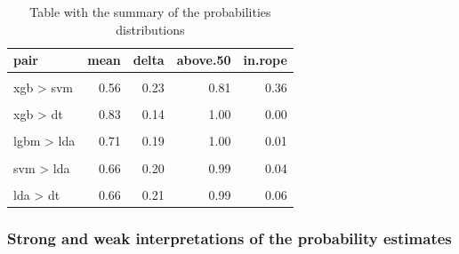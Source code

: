 \documentclass[twoside,11pt,preprint]{article}
\begin{document}
\begin{table}

\caption{\label{tab:xtaball2}\label{tab:main}Table with the summary of the probabilities distributions}
\centering
\begin{tabular}[t]{lrrrr}
\toprule
\textbf{pair} & \textbf{mean} & \textbf{delta} & \textbf{above.50} & \textbf{in.rope}\\
\midrule
\cellcolor{gray!6}{xgb > lgbm} & \cellcolor{gray!6}{0.51} & \cellcolor{gray!6}{0.23} & \cellcolor{gray!6}{0.56} & \cellcolor{gray!6}{0.51}\\
xgb > svm & 0.56 & 0.23 & 0.81 & 0.36\\
\cellcolor{gray!6}{xgb > lda} & \cellcolor{gray!6}{0.72} & \cellcolor{gray!6}{0.19} & \cellcolor{gray!6}{1.00} & \cellcolor{gray!6}{0.00}\\
xgb > dt & 0.83 & 0.14 & 1.00 & 0.00\\
\cellcolor{gray!6}{lgbm > svm} & \cellcolor{gray!6}{0.55} & \cellcolor{gray!6}{0.22} & \cellcolor{gray!6}{0.78} & \cellcolor{gray!6}{0.41}\\
\addlinespace
lgbm > lda & 0.71 & 0.19 & 1.00 & 0.01\\
\cellcolor{gray!6}{lgbm > dt} & \cellcolor{gray!6}{0.82} & \cellcolor{gray!6}{0.14} & \cellcolor{gray!6}{1.00} & \cellcolor{gray!6}{0.00}\\
svm > lda & 0.66 & 0.20 & 0.99 & 0.04\\
\cellcolor{gray!6}{svm > dt} & \cellcolor{gray!6}{0.79} & \cellcolor{gray!6}{0.16} & \cellcolor{gray!6}{1.00} & \cellcolor{gray!6}{0.00}\\
lda > dt & 0.66 & 0.21 & 0.99 & 0.06\\
\bottomrule
\end{tabular}
\end{table}

\hypertarget{strong-and-weak-interpretations-of-the-probability-estimates}{%
\subsubsection{\texorpdfstring{Strong and weak interpretations of the probability estimates \label{strong-weak}}{Strong and weak interpretations of the probability estimates }}\label{strong-and-weak-interpretations-of-the-probability-estimates}}
\end{document}
